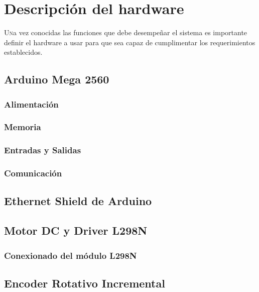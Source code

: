 \chapter{Descripción del hardware}\label{chp-02}

\lettrine[lraise=-0.1, lines=2, loversize=0.2]{U}na vez conocidas las funciones
que debe desempeñar el sistema es importante definir el hardware a usar para que
sea capaz de cumplimentar los requerimientos establecidos.

\section{Arduino Mega 2560}

\subsection{Alimentación}

\subsection{Memoria}

\subsection{Entradas y Salidas}

\subsection{Comunicación}

\section{Ethernet Shield de Arduino}

\section{Motor DC y Driver L298N}

\subsection{Conexionado del módulo L298N}

\section{Encoder Rotativo Incremental}

